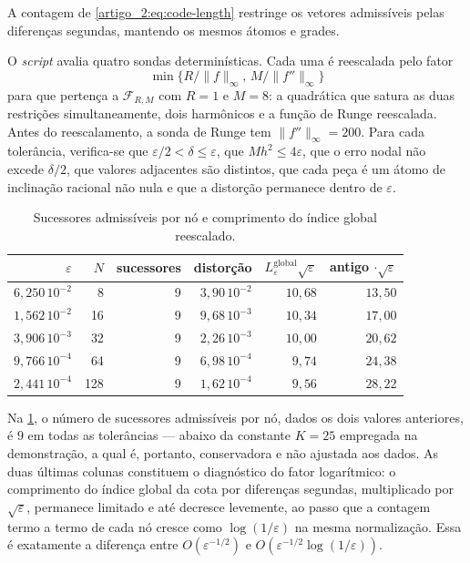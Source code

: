 \documentclass[12pt,a4paper]{article}
\theoremstyle{preciso}
\theoremstyle{definition}
\theoremstyle{preciso}
\theoremstyle{preciso}
\theoremstyle{preciso}
\theoremstyle{preciso}
\theoremstyle{definition}
\theoremstyle{preciso}
\theoremstyle{definition}
\theoremstyle{preciso}
\theoremstyle{preciso}
\theoremstyle{definition}
\begin{document}
A contagem de \eqref{artigo_2:eq:code-length} restringe os vetores admissíveis pelas diferenças segundas, mantendo os mesmos átomos e grades.

O \emph{script} avalia quatro sondas determinísticas. Cada uma é reescalada pelo fator
\[\min\{R/\|f\|_\infty,\,M/\|f''\|_\infty\}\]
para que pertença a
$\mathcal F_{R,M}$ com $R=1$ e $M=8$: a quadrática que satura as duas
restrições simultaneamente, dois harmônicos e a função de Runge reescalada.
Antes do reescalamento, a sonda de Runge tem $\|f''\|_\infty=200$. Para cada tolerância, verifica-se que
$\varepsilon/2<\delta\le\varepsilon$, que $Mh^2\le4\varepsilon$, que o erro
nodal não excede $\delta/2$, que valores adjacentes são distintos, que cada
peça é um átomo de inclinação racional não nula e que a distorção permanece dentro
de $\varepsilon$.

\begin{table}[t]
\centering
\caption{Sucessores admissíveis por nó e comprimento do índice global reescalado.}
\label{artigo_2:tab:codebook-pt}
\small
\begin{tabular}{rrrrrr}
\toprule
$\varepsilon$ & $N$ & sucessores & distorção & $L_\varepsilon^{\mathrm{global}}\sqrt{\varepsilon}$ & antigo $\cdot\sqrt{\varepsilon}$\\
\midrule
$6{,}250\,10^{-2}$ & 8   & 9 & $3{,}90\,10^{-2}$ & $10{,}68$ & $13{,}50$\\
$1{,}562\,10^{-2}$ & 16  & 9 & $9{,}68\,10^{-3}$ & $10{,}34$ & $17{,}00$\\
$3{,}906\,10^{-3}$ & 32  & 9 & $2{,}26\,10^{-3}$ & $10{,}00$ & $20{,}62$\\
$9{,}766\,10^{-4}$ & 64  & 9 & $6{,}98\,10^{-4}$ & $9{,}74$  & $24{,}38$\\
$2{,}441\,10^{-4}$ & 128 & 9 & $1{,}62\,10^{-4}$ & $9{,}56$  & $28{,}22$\\
\bottomrule
\end{tabular}
\end{table}

Na \cref{artigo_2:tab:codebook-pt}, o número de sucessores
admissíveis por nó, dados os dois valores anteriores, é $9$ em todas as
tolerâncias --- abaixo da constante $K=25$ empregada na demonstração, a qual é,
portanto, conservadora e não ajustada aos dados. As duas últimas colunas constituem o
diagnóstico do fator logarítmico: o comprimento do índice global da cota por diferenças segundas,
multiplicado por $\sqrt{\varepsilon}$, permanece limitado e até decresce
levemente, ao passo que a contagem termo a termo de cada nó cresce
como $\log(1/\varepsilon)$ na mesma normalização. Essa é exatamente a diferença
entre $O(\varepsilon^{-1/2})$ e $O(\varepsilon^{-1/2}\log(1/\varepsilon))$.
\end{document}
